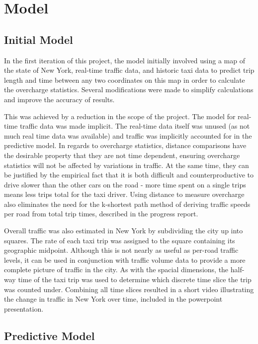\documentclass{sig-alternate}
\begin{document}
\section{Model}
\subsection{Initial Model}
In the first iteration of this project, the model initially involved using a map of the state of New York, real-time traffic data, and historic taxi data to predict trip length and time between any two coordinates on this map in order to calculate the overcharge statistics. Several modifications were made to simplify calculations and improve the accuracy of results. 

This was achieved by a reduction in the scope of the project. The model for real-time traffic data was made implicit. The real-time data itself was unused (as not much real time data was available) and traffic was implicitly accounted for in the predictive model. In regards to overcharge statistics, distance comparisons have the desirable property that they are not time dependent, ensuring overcharge statistics will not be affected by variations in traffic. At the same time, they can be justified by the empirical fact that it is both difficult and counterproductive to drive slower than the other cars on the road - more time spent on a single trips means less trips total for the taxi driver. Using distance to measure overcharge also eliminates the need for the k-shortest path method\cite{yen} of deriving traffic speeds per road from total trip times, described in the progress report.

Overall traffic was also estimated in New York by subdividing the city up into squares. The rate of each taxi trip was assigned to the square containing its geographic midpoint. Although this is not nearly as useful as per-road traffic levels, it can be used in conjunction with traffic volume data to provide a more complete picture of traffic in the city. As with the spacial dimensions, the half-way time of the taxi trip was used to determine which discrete time slice the trip was counted under. Combining all time slices resulted in a short video illustrating the change in traffic in New York over time, included in the powerpoint presentation.


\subsection{Predictive Model}
\end{document}
